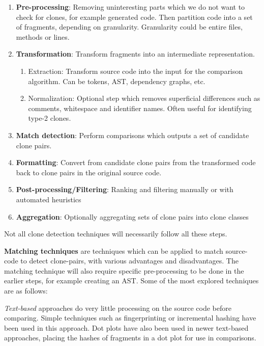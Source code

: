 \documentclass[12pt]{article}
\begin{document}
\begin{enumerate}
	\item \textbf{Pre-processing}: Removing uninteresting parts which we do not want to
	      check for clones, for example generated code. Then partition code into a set of
	      fragments, depending on granularity. Granularity could be entire files, methods or lines.
	\item \textbf{Transformation}: Transform fragments into an intermediate representation.
	      \begin{enumerate}
		      \item Extraction: Transform source code into the input for the comparison
		            algorithm. Can be tokens, AST, dependency graphs, etc.
		      \item Normalization: Optional step which removes superficial differences such as
		            comments, whitespace and identifier names. Often useful for identifying type-2
		            clones.
	      \end{enumerate}
	\item \textbf{Match detection}: Perform comparisons which outputs a set of
	      candidate clone pairs.
	\item \textbf{Formatting}: Convert from candidate clone pairs from the transformed
	      code back to clone pairs in the original source code.
	\item \textbf{Post-processing/Filtering}: Ranking and filtering manually or with
	      automated heuristics
	\item \textbf{Aggregation}: Optionally aggregating sets of clone pairs into clone classes
\end{enumerate}

Not all clone detection techniques will necessarily follow all these steps.

\textbf{Matching techniques} are techniques which can be applied to match source-code to
detect clone-pairs, with various advantages and disadvantages. The matching technique will
also require specific pre-processing to be done in the earlier steps, for example creating an
AST. Some of the most explored techniques are as follows\cite{ComparisonAndEvaluationOfTechniques}:

\textit{Text-based} approaches do very little processing on the source code before
comparing. Simple techniques such as fingerprinting or incremental hashing have been used
in this approach. Dot plots have also been used in newer text-based approaches, placing
the hashes of fragments in a dot plot for use in comparisons.
\end{document}
